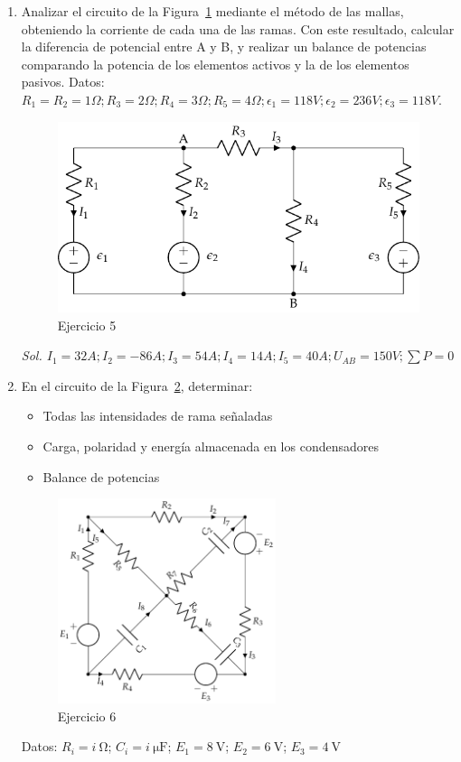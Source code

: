 \begin{enumerate}
\item Analizar el circuito de la Figura~\ref{fig.mallas2} mediante el método de las mallas, obteniendo la corriente de cada una de las ramas. Con este resultado, calcular la diferencia de potencial entre A y B, y realizar un balance de potencias comparando la potencia de los elementos activos y la de los elementos pasivos. Datos: $R_1 = R_2 = {1}\Omega; R_3 = {2}\Omega; R_4 = {3}\Omega; R_5={4}\Omega; \epsilon_1={118} V; \epsilon_2 = 236V; \epsilon_3 = {118}V$.\\
  \begin{figure}[H]
    \centering \includegraphics{../figs/mallas2.pdf}
    \caption{Ejercicio 5}
    \label{fig.mallas2}
  \end{figure}
  \emph{Sol.
    $I_1 = {32}A; I_2 = {-86} A; I_3 ={54}A; I_4 = {14}A; I_5 = {40}A;
    U_{AB}=150V; \sum P=0$}
 	
\item En el circuito de la Figura~\ref{fig.ej9_BT1}, determinar:
  \begin{itemize}
  \item Todas las intensidades de rama señaladas
  \item Carga, polaridad y energía almacenada en los condensadores
  \item Balance de potencias
  \end{itemize}
  \begin{figure}[H]
    \centering \includegraphics[height=6cm]{../figs/ej9_BT1.pdf}
    \caption{Ejercicio 6}
    \label{fig.ej9_BT1}
  \end{figure}
  Datos: $R_i = \qty[parse-numbers=false]{i}{\ohm}$; $C_i = \qty[parse-numbers=false]{i}{\micro\farad}$; $E_1 = \qty{8}{\volt}$; $E_2 = \qty{6}{\volt}$; $E_3 = \qty{4}{\volt}$


\end{enumerate}
